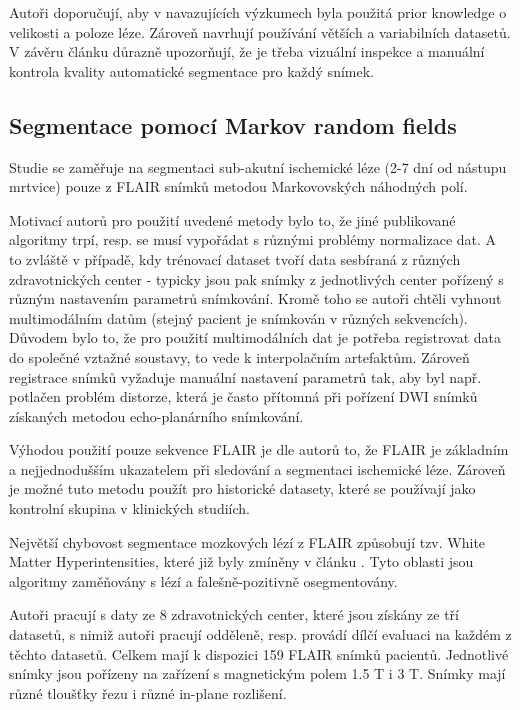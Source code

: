 \documentclass[11pt]{article}
\begin{document}
Autoři doporučují, aby v navazujících výzkumech byla použitá prior knowledge o velikosti a poloze léze. Zároveň navrhují používání větších a variabilních datasetů. V závěru článku důrazně upozorňují, že je třeba vizuální inspekce a manuální kontrola kvality automatické segmentace pro každý snímek.

\subsection{Segmentace pomocí Markov random fields}
Studie \cite{Subbanna2019} se zaměřuje na segmentaci sub-akutní ischemické léze (2-7 dní od nástupu mrtvice) pouze z FLAIR snímků metodou Markovovských náhodných polí.

Motivací autorů pro použití uvedené metody bylo to, že jiné publikované algoritmy trpí, resp. se musí vypořádat s různými problémy normalizace dat. A to zvláště v případě, kdy trénovací dataset tvoří data sesbíraná z různých zdravotnických center - typicky jsou pak snímky z jednotlivých center pořízený s různým nastavením parametrů snímkování. Kromě toho se autoři chtěli vyhnout multimodálním datům (stejný pacient je snímkován v různých sekvencích). Důvodem bylo to, že pro použití multimodálních dat je potřeba registrovat data do společné vztažné soustavy, to vede k interpolačním artefaktům. Zároveň registrace snímků vyžaduje manuální nastavení parametrů tak, aby byl např. potlačen problém \alert{distorze}, která je často přítomná při pořízení DWI snímků získaných metodou echo-planárního snímkování.

Výhodou použití pouze sekvence FLAIR je dle autorů to, že FLAIR je základním a nejjednodušším ukazatelem při sledování a segmentaci ischemické léze. Zároveň je možné tuto metodu použít pro historické datasety, které se používají jako kontrolní skupina v klinických studiích.

Největší chybovost segmentace mozkových lézí z FLAIR způsobují tzv. White Matter Hyperintensities, které již byly zmíněny v článku \cite{Maier2016}. Tyto oblasti jsou algoritmy zaměňovány s lézí a falešně-pozitivně osegmentovány.

Autoři pracují s daty ze 8 zdravotnických center, které jsou získány ze tří datasetů, s nimiž autoři pracují odděleně, resp. provádí dílčí evaluaci na každém z těchto datasetů. Celkem mají k dispozici 159 FLAIR snímků pacientů. Jednotlivé snímky jsou pořízeny na zařízení s magnetickým polem 1.5 T i 3 T. Snímky mají různé tloušťky řezu i různé \alert{in-plane} rozlišení.
\end{document}
